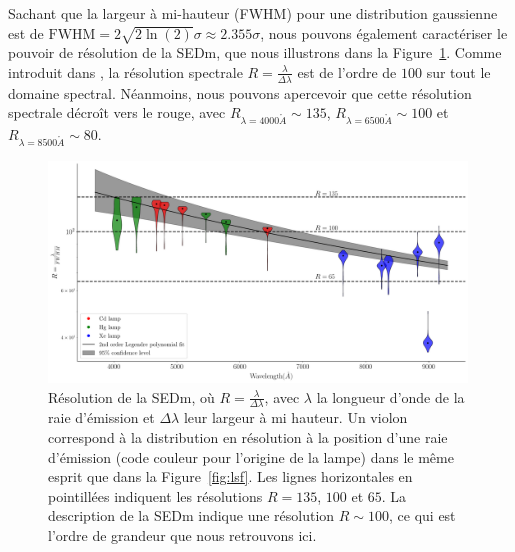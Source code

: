 \documentclass[../main/main.tex]{subfiles}
\begin{document}
Sachant que la largeur à mi-hauteur (FWHM) pour une distribution
gaussienne est de $\text{FWHM}=2\sqrt{2\ln(2)}\sigma\approx2.355\sigma$, nous
pouvons également caractériser le pouvoir de résolution de la SEDm, que
nous illustrons dans la Figure~\ref{fig:resolutionsedm}.
Comme introduit dans \citet{SEDM18}, la résolution spectrale
$R=\frac{\lambda}{\Delta\lambda}$ est de l'ordre de $100$ sur tout le
domaine spectral. Néanmoins, nous pouvons apercevoir que cette
résolution spectrale décroît vers le rouge, avec
$R_{\lambda=4000\mathring{A}}\sim135$,
$R_{\lambda=6500\mathring{A}}\sim100$ et $R_{\lambda=8500\mathring{A}}\sim80$.\\

\begin{figure}[h!]
  \centering
  \includegraphics[width=0.99\textwidth]{../figures/06_irf/SEDmResolution_wmodel.pdf}
  \caption[Résolution de la SEDm]{Résolution de la SEDm, où
    $R=\frac{\lambda}{\Delta\lambda}$, avec $\lambda$ la longueur d'onde
  de la raie d'émission et $\Delta\lambda$ leur largeur à mi
  hauteur. Un violon correspond à la distribution en résolution à la
  position d'une raie d'émission (code couleur pour l'origine de la
  lampe) dans le même esprit que dans la Figure~\ref{fig:lsf}. Les lignes horizontales en pointillées indiquent les
  résolutions $R=135$, $100$ et $65$. La description de la SEDm
  \citep{SEDM18} indique une résolution $R\sim100$, ce qui est l'ordre
  de grandeur que nous retrouvons ici.}
  \label{fig:resolutionsedm}
\end{figure}


\end{document}
